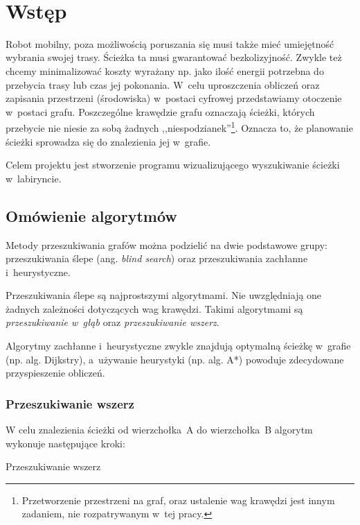 \documentclass[11pt,a4paper,oneside]{mwart}
\begin{document}



\newpage
\thispagestyle{empty}
~~~~~~~~~~~~~~
\newpage

\setcounter{tocdepth}{3}
\tableofcontents
\newpage

\section{Wstęp}

Robot mobilny, poza możliwością poruszania się musi także mieć umiejętność wybrania swojej trasy.
Ścieżka ta musi gwarantować bezkolizyjność. 
Zwykle też chcemy minimalizować koszty wyrażany np. jako ilość energii potrzebna do przebycia trasy 
lub czas jej pokonania.
W~celu uproszczenia obliczeń oraz zapisania przestrzeni (środowiska) w~postaci cyfrowej przedstawiamy 
otoczenie w~postaci grafu. 
Poszczególne krawędzie grafu oznaczają ścieżki, których przebycie nie niesie za sobą żadnych 
,,niespodzianek''\footnote{Przetworzenie przestrzeni na graf, oraz ustalenie wag krawędzi jest innym 
zadaniem, nie rozpatrywanym w~tej pracy.}.
Oznacza to, że planowanie ścieżki sprowadza się do znalezienia jej w~grafie.

Celem projektu jest stworzenie programu wizualizującego wyszukiwanie ścieżki w~labiryncie.

\subsection{Omówienie algorytmów}

Metody przeszukiwania grafów można podzielić na dwie podstawowe grupy: 
przeszukiwania ślepe (ang. \emph{blind search}) oraz przeszukiwania zachłanne i~heurystyczne.

Przeszukiwania ślepe są najprostszymi algorytmami. 
Nie uwzględniają one żadnych zależności dotyczących wag krawędzi.
Takimi algorytmami są \emph{przeszukiwanie w~głąb} oraz \emph{przeszukiwanie wszerz}.

Algorytmy zachłanne i~heurystyczne zwykle znajdują optymalną ścieżkę w~grafie 
(np. alg. Dijkstry), a~używanie heurystyki (np. alg. A*) powoduje zdecydowane przyspieszenie obliczeń.

\subsubsection{Przeszukiwanie wszerz}
W celu znalezienia ścieżki od wierzchołka~A do wierzchołka~B algorytm wykonuje następujące kroki:
\begin{algorithm}
\caption{Przeszukiwanie wszerz}
\label{algorytm_wszerz}
\begin{algorithmic}[1]
		\ENDIF
	\ENDFOR
\ENDWHILE
\end{algorithmic}
\end{algorithm}
\end{document}
